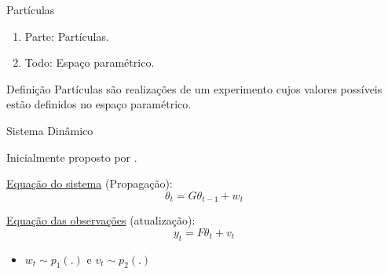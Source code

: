 \documentclass{beamer}
\begin{document}
\begin{frame}{Partículas}
\noindent


    \begin{enumerate}
      \item<2-| alert@2> Parte: Partículas.
      \item<3-| alert@3> Todo: Espaço paramétrico.
    \end{enumerate}
    
\pause
\pause
\pause
  \begin{block}{Definição}
  {\large Partículas são realizações de um experimento cujos valores possíveis estão definidos no espaço paramétrico.}
\end{block}


 
\end{frame}



\begin{frame}{Sistema Dinâmico}

Inicialmente proposto por \cite{gordon}.

\vspace{0.5cm}

\underline{Equação do sistema} (Propagação):
$$\theta_t = G\theta_{t-1} + w_t$$

\pause

\underline{Equação das observações} (atualização):
$$y_t = F\theta_{t} +  v_t $$

\pause

\begin{itemize}
\item $w_t \sim p_1(.)$ e $v_t\sim p_2(.)$
\end{itemize}

\end{frame}
\end{document}
